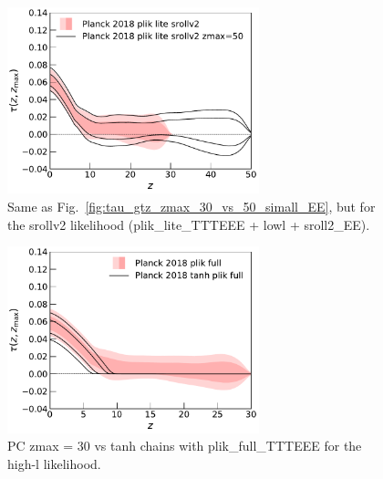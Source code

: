 \documentclass[prd,amsmath,amssymb,floatfix,superscriptaddress,nofootinbib]{revtex4-1}
\begin{document}
\begin{figure}
\includegraphics[width=0.65\textwidth]{results/direct_mcmc/pl18_plots_zmax30/plot_pub_tau_gtz_dz_0p1_pl18_pc_zmax30_pliklite_srollv2_0930_and_pl18_pc_zmax50_pliklite_srollv2.pdf}
\caption{Same as Fig.~\ref{fig:tau_gtz_zmax_30_vs_50_simall_EE}, but for the srollv2 likelihood (plik\_lite\_TTTEEE + lowl + sroll2\_EE).
}
\label{fig:}
\end{figure}

\begin{figure}
\includegraphics[width=0.65\textwidth]{results/direct_mcmc/pl18_plots_zmax30/plot_pub_tau_gtz_dz_0p1_pl18_pc_zmax30_plikfull_and_pl18_tanh_post_plikfull.pdf}
\caption{PC zmax = 30 vs tanh chains with plik\_full\_TTTEEE for the high-l likelihood.
}
\label{fig:}
\end{figure}
\end{document}
